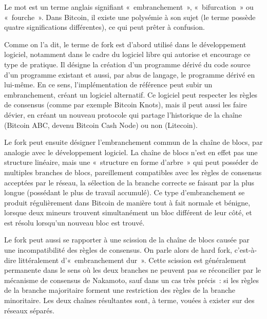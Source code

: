 Le mot  est un terme anglais signifiant «~embranchement~», «~bifurcation~» ou «~fourche~». Dans Bitcoin, il existe une polysémie à son sujet (le terme possède quatre significations différentes), ce qui peut prêter à confusion.

Comme on l'a dit, le terme de fork est d'abord utilisé dans le développement logiciel, notamment dans le cadre du logiciel libre qui autorise et encourage ce type de pratique. Il désigne la création d'un programme dérivé du code source d'un programme existant et aussi, par abus de langage, le programme dérivé en lui-même. En ce sens, l'implémentation de référence peut subir un embranchement, créant un logiciel alternatif. Ce logiciel peut respecter les règles de consensus (comme par exemple Bitcoin Knots), mais il peut aussi les faire dévier, en créant un nouveau protocole qui partage l'historique de la chaîne (Bitcoin ABC, devenu Bitcoin Cash Node) ou non (Litecoin).

Le fork peut ensuite désigner l'embranchement commun de la chaîne de blocs, par analogie avec le développement logiciel. La chaîne de blocs n'est en effet pas une structure linéaire, mais une «~structure en forme d'arbre~» qui peut posséder de multiples branches de blocs, pareillement compatibles avec les règles de consensus acceptées par le réseau, la sélection de la branche correcte se faisant par la plus longue (possédant le plus de travail accumulé). Ce type d'embranchement se produit régulièrement dans Bitcoin de manière tout à fait normale et bénigne, lorsque deux mineurs trouvent simultanément un bloc différent de leur côté, et est résolu lorsqu'un nouveau bloc est trouvé.

Le fork peut aussi se rapporter à une scission de la chaîne de blocs causée par une incompatibilité des règles de consensus. On parle alors de hard fork, c'est-à-dire littéralement d'«~embranchement dur~». Cette scission est généralement permanente dans le sens où les deux branches ne peuvent pas se réconcilier par le mécanisme de consensus de Nakamoto, sauf dans un cas très précis~: si les règles de la branche majoritaire forment une restriction des règles de la branche minoritaire. Les deux chaînes résultantes sont, à terme, vouées à exister sur des réseaux séparés.

